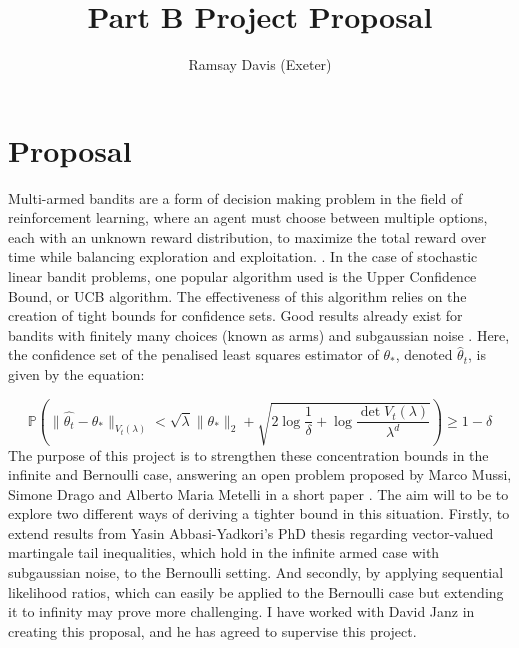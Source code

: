 \documentclass[a4paper,12pt]{article}
\title{Part B Project Proposal }
\author{Ramsay Davis (Exeter)}
\date{}
\begin{document}
\maketitle

\section*{Proposal}
Multi-armed bandits are a form of decision making problem in the field of reinforcement learning, where an agent must choose between multiple options, each with an unknown reward distribution, to maximize the total reward over time while balancing exploration and exploitation. \cite{banditbook}. In the case of stochastic linear bandit problems, one popular algorithm used is the Upper Confidence Bound, or UCB algorithm. The effectiveness of this algorithm relies on the creation of tight bounds for confidence sets. Good results already exist for bandits with finitely many choices (known as arms) and subgaussian noise \cite{banditbook}. Here, the confidence set of the penalised least squares estimator of $\theta_*$, denoted $\hat{\theta}_{t}$, is given by the equation: 

\begin{equation}
    \mathbb{P}(\|\hat{\theta_{t}}-\theta_{*}\|_{V_t(\lambda)}<\sqrt{\lambda}\|\theta_*\|_2+\sqrt{2\log{\frac{1}{\delta}}+\log{\frac{\det{V_t(\lambda)}}{\lambda^d}}}) \geq1-\delta
\end{equation}
The purpose of this project is to strengthen these concentration bounds in the infinite and Bernoulli case, answering an open problem proposed by Marco Mussi, Simone Drago and Alberto Maria Metelli in a short paper \cite{open}. The aim will to be to explore two different ways of deriving a tighter bound in this situation. Firstly, to extend results from Yasin Abbasi-Yadkori's PhD thesis \cite{phd} regarding vector-valued martingale tail inequalities, which hold in the infinite armed case with subgaussian noise, to the Bernoulli setting. And secondly, by applying sequential likelihood ratios, which can easily be applied to the Bernoulli case but extending it to infinity may prove more challenging. 
I have worked with David Janz in creating this proposal, and he has agreed to supervise this project.




\end{document}
